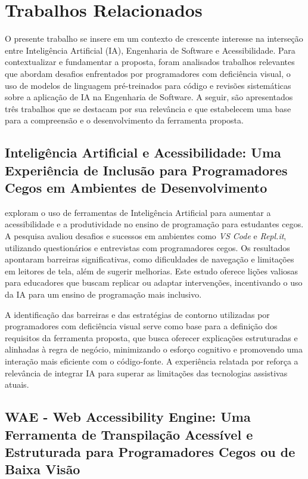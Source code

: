 \documentclass[
    12pt,                   %
    openright,              %
    oneside,                %
    a4paper,                %
    sumario=tradicional,    %
    english,                %
    brazil,                 %
    ]{abntex2}
\begin{document}
\chapter{Trabalhos Relacionados}\label{sec:TrabRel}

O presente trabalho se insere em um contexto de crescente interesse na interseção entre Inteligência Artificial (IA), Engenharia de Software e Acessibilidade. Para contextualizar e fundamentar a proposta, foram analisados trabalhos relevantes que abordam desafios enfrentados por programadores com deficiência visual, o uso de modelos de linguagem pré-treinados para código e revisões sistemáticas sobre a aplicação de IA na Engenharia de Software. A seguir, são apresentados três trabalhos que se destacam por sua relevância e que estabelecem uma base para a compreensão e o desenvolvimento da ferramenta proposta.

\section{Inteligência Artificial e Acessibilidade: Uma Experiência de Inclusão para Programadores Cegos em Ambientes de Desenvolvimento}

\textcite{latinoware34224} exploram o uso de ferramentas de Inteligência Artificial para aumentar a acessibilidade e a produtividade no ensino de programação para estudantes cegos. A pesquisa avaliou desafios e sucessos em ambientes como \textit{VS Code} e \textit{Repl.it}, utilizando questionários e entrevistas com programadores cegos. Os resultados apontaram barreiras significativas, como dificuldades de navegação e limitações em leitores de tela, além de sugerir melhorias. Este estudo oferece lições valiosas para educadores que buscam replicar ou adaptar intervenções, incentivando o uso da IA para um ensino de programação mais inclusivo.

A identificação das barreiras e das estratégias de contorno utilizadas por programadores com deficiência visual serve como base para a definição dos requisitos da ferramenta proposta, que busca oferecer explicações estruturadas e alinhadas à regra de negócio, minimizando o esforço cognitivo e promovendo uma interação mais eficiente com o código-fonte. A experiência relatada por \textcite{latinoware34224} reforça a relevância de integrar IA para superar as limitações das tecnologias assistivas atuais.

\section{WAE - Web Accessibility Engine: Uma Ferramenta de Transpilação Acessível e Estruturada para Programadores Cegos ou de Baixa Visão}
\end{document}
